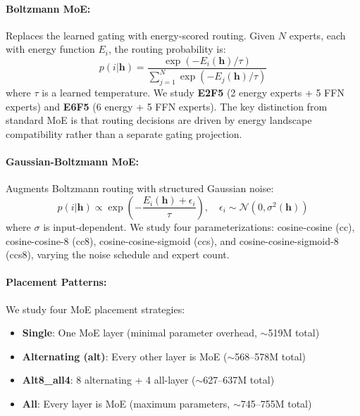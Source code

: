 \documentclass[oneside]{article}
\begin{document}
\paragraph{Boltzmann MoE:} Replaces the learned gating with energy-scored routing. Given $N$ experts, each with energy function $E_i$, the routing probability is:
\begin{equation}
    p(i | \mathbf{h}) = \frac{\exp(-E_i(\mathbf{h}) / \tau)}{\sum_{j=1}^N \exp(-E_j(\mathbf{h}) / \tau)}
\end{equation}
where $\tau$ is a learned temperature. We study \textbf{E2F5} (2 energy experts + 5 FFN experts) and \textbf{E6F5} (6 energy + 5 FFN experts). The key distinction from standard MoE is that routing decisions are driven by energy landscape compatibility rather than a separate gating projection.

\paragraph{Gaussian-Boltzmann MoE:} Augments Boltzmann routing with structured Gaussian noise:
\begin{equation}
    p(i | \mathbf{h}) \propto \exp\left(-\frac{E_i(\mathbf{h}) + \epsilon_i}{\tau}\right), \quad \epsilon_i \sim \mathcal{N}(0, \sigma^2(\mathbf{h}))
\end{equation}
where $\sigma$ is input-dependent. We study four parameterizations: cosine-cosine (cc), cosine-cosine-8 (cc8), cosine-cosine-sigmoid (ccs), and cosine-cosine-sigmoid-8 (ccs8), varying the noise schedule and expert count.

\paragraph{Placement Patterns:} We study four MoE placement strategies:
\begin{itemize}
    \item \textbf{Single}: One MoE layer (minimal parameter overhead, $\sim$519M total)
    \item \textbf{Alternating (alt)}: Every other layer is MoE ($\sim$568--578M total)
    \item \textbf{Alt8\_all4}: 8 alternating + 4 all-layer ($\sim$627--637M total)
    \item \textbf{All}: Every layer is MoE (maximum parameters, $\sim$745--755M total)
\end{itemize}


\end{document}
